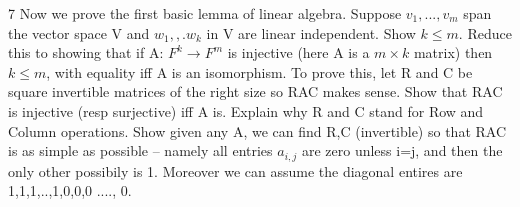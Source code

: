 \documentclass{article}
\newcommand{\rarr}[0]{\rightarrow}
\begin{document}
\begin{PROB}{7}\label{Problem 7.}
	Now we prove the first basic lemma of linear algebra. Suppose $v_1,...,v_m$ span the vector space V and $w_1,,.w_k$ in V are linear independent. Show $k \leq m$.  Reduce this to showing that if A: $F^k \rarr F^m$ is injective (here A is a $m \times k$ matrix) then $k \leq m$, with equality iff A is an isomorphism. To prove this, let R and C be square invertible matrices of the right size so RAC makes sense. Show that RAC is injective (resp surjective) iff A is. Explain why R and C stand for Row and Column operations. Show given any A, we can find R,C (invertible) so that RAC is as simple as possible -- namely all entries $a_{i,j}$ are zero unless i=j, and then the only other possibily is 1.  Moreover we can assume the diagonal entires are 1,1,1,..,1,0,0,0 ...., 0.
\end{PROB}
\end{document}
